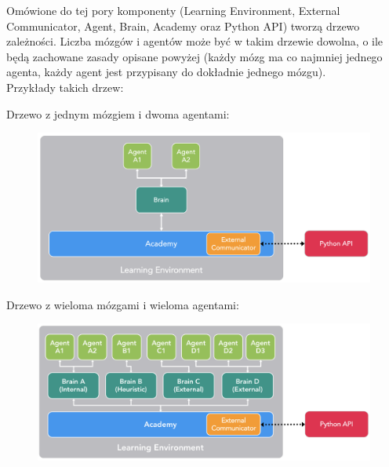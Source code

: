Omówione do tej pory komponenty (Learning Environment, External Communicator, Agent, Brain, Academy oraz Python API) tworzą drzewo zależności. Liczba mózgów i agentów może być w takim drzewie dowolna, o ile będą zachowane zasady opisane powyżej (każdy mózg ma co najmniej jednego agenta, każdy agent jest przypisany do dokładnie jednego mózgu). \\ Przykłady takich drzew:
\begin{itemize*}
\item Drzewo z jednym mózgiem i dwoma agentami:
\begin{figure}[h]
\begin{center}
\includegraphics[width=15cm]{resources/figures/unitymla_learning_env_example.png}
\label{UnityMlaSimpleModel}
\end{center}
\end{figure}

\item Drzewo z wieloma mózgami i wieloma agentami:
\begin{figure}[h]
\begin{center}
\includegraphics[width=15cm]{resources/figures/unitymla_learning_env_example_2.png}
\label{UnityMlaComplexModel}
\end{center}
\end{figure}

\end{itemize*}

